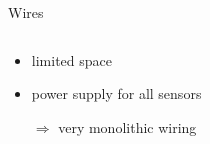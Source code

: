 \documentclass{beamer}
\begin{document}
	\begin{frame}[t]{Wires}
		\begin{columns}[T]
			\begin{column}{0.5\textwidth}
				\begin{minipage}{\textwidth}
					\resizebox{0.9\textwidth}{!}{}
				\end{minipage}
				\begin{minipage}{\textwidth}
					\vspace{0.5cm}
					\begin{itemize}
						\item limited space
						\item power supply for all sensors
						\item[$\Rightarrow$] very monolithic wiring
					\end{itemize}
				\end{minipage}
			\end{column}
			\begin{column}{0.5\textwidth}
			\end{column}
		\end{columns}
	\end{frame}
\end{document}
